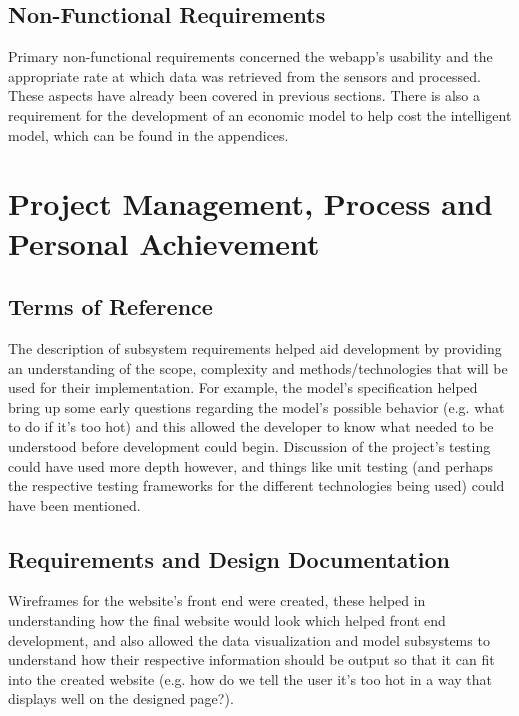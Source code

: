 \documentclass[]{report}
\begin{document}
	\subsection{Non-Functional Requirements}
	Primary non-functional requirements concerned the webapp's usability and the appropriate rate at which data was retrieved from the sensors and processed. These aspects have already been covered in previous sections. There is also a requirement for the development of an economic model to help cost the intelligent model, which can be found in the appendices.
	

\section{Project Management, Process and Personal Achievement}
	\subsection{Terms of Reference}
	The description of subsystem requirements helped aid development by providing an understanding of the scope, complexity and methods/technologies that will be used for their implementation. For example, the model's specification helped bring up some early questions regarding the model's possible behavior (e.g. what to do if it's too hot) and this allowed the developer to know what needed to be understood before development could begin. Discussion of the project's testing could have used more depth however, and things like unit testing (and perhaps the respective testing frameworks for the different technologies being used) could have been mentioned.
	
	\subsection{Requirements and Design Documentation}
	Wireframes for the website's front end were created, these helped in understanding how the final website would look which helped front end development, and also allowed the data visualization and model subsystems to understand how their respective information should be output so that it can fit into the created website (e.g. how do we tell the user it's too hot in a way that displays well on the designed page?).
	
\end{document}
